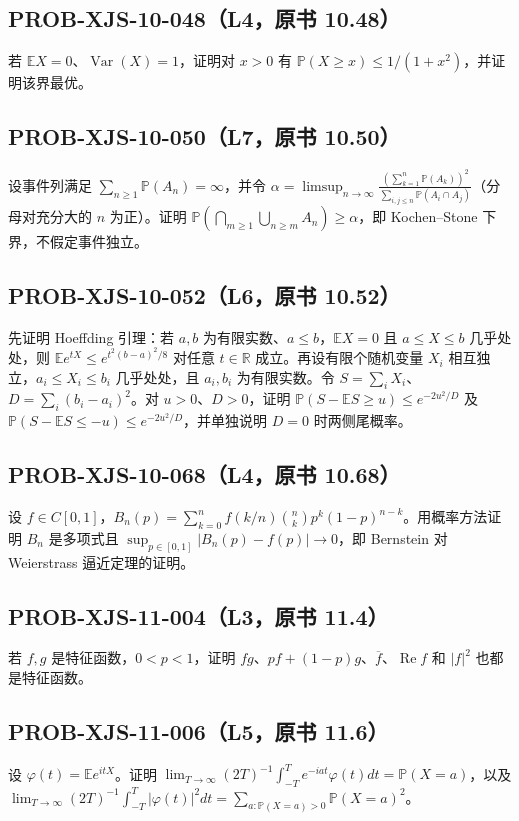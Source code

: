 \documentclass[UTF8]{ctexart}
\begin{document}
\subsection*{PROB-XJS-10-048（L4，原书 10.48）}
若 $\mathbb EX=0$、$\operatorname{Var}(X)=1$，证明对 $x>0$ 有 $\mathbb P(X\ge x)\le1/(1+x^2)$，并证明该界最优。

\subsection*{PROB-XJS-10-050（L7，原书 10.50）}
设事件列满足 $\sum_{n\ge1}\mathbb P(A_n)=\infty$，并令 $\alpha=\limsup_{n\to\infty}\frac{(\sum_{k=1}^n\mathbb P(A_k))^2}{\sum_{i,j\le n}\mathbb P(A_i\cap A_j)}$（分母对充分大的 $n$ 为正）。证明 $\mathbb P(\bigcap_{m\ge1}\bigcup_{n\ge m}A_n)\ge\alpha$，即 Kochen–Stone 下界，不假定事件独立。

\subsection*{PROB-XJS-10-052（L6，原书 10.52）}
先证明 Hoeffding 引理：若 $a,b$ 为有限实数、$a\le b$，$\mathbb EX=0$ 且 $a\le X\le b$ 几乎处处，则 $\mathbb Ee^{tX}\le e^{t^2(b-a)^2/8}$ 对任意 $t\in\mathbb R$ 成立。再设有限个随机变量 $X_i$ 相互独立，$a_i\le X_i\le b_i$ 几乎处处，且 $a_i,b_i$ 为有限实数。令 $S=\sum_iX_i$、$D=\sum_i(b_i-a_i)^2$。对 $u>0$、$D>0$，证明 $\mathbb P(S-\mathbb ES\ge u)\le e^{-2u^2/D}$ 及 $\mathbb P(S-\mathbb ES\le-u)\le e^{-2u^2/D}$，并单独说明 $D=0$ 时两侧尾概率。

\subsection*{PROB-XJS-10-068（L4，原书 10.68）}
设 $f\in C[0,1]$，$B_n(p)=\sum_{k=0}^n f(k/n)\binom nkp^k(1-p)^{n-k}$。用概率方法证明 $B_n$ 是多项式且 $\sup_{p\in[0,1]}|B_n(p)-f(p)|\to0$，即 Bernstein 对 Weierstrass 逼近定理的证明。

\subsection*{PROB-XJS-11-004（L3，原书 11.4）}
若 $f,g$ 是特征函数，$0<p<1$，证明 $fg$、$pf+(1-p)g$、$\overline f$、$\operatorname{Re}f$ 和 $|f|^2$ 也都是特征函数。

\subsection*{PROB-XJS-11-006（L5，原书 11.6）}
设 $\varphi(t)=\mathbb Ee^{itX}$。证明 $\lim_{T\to\infty}(2T)^{-1}\int_{-T}^Te^{-iat}\varphi(t)dt=\mathbb P(X=a)$，以及 $\lim_{T\to\infty}(2T)^{-1}\int_{-T}^T|\varphi(t)|^2dt=\sum_{a:\mathbb P(X=a)>0}\mathbb P(X=a)^2$。
\end{document}
